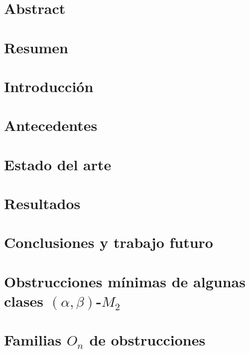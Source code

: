 \documentclass[12pt]{book}
\theoremstyle{definition}
\begin{document}





\chapter*{Abstract}

\chapter*{Resumen}


\tableofcontents

\listoffigures

\listoftables

\chapter{Introducción}

\chapter{Antecedentes}

\chapter{Estado del arte}
\label{cap3}
\chapter{Resultados}\label{cap4}

\chapter{Conclusiones y trabajo futuro}


\appendix

\chapter{Obstrucciones mínimas de algunas clases $(\alpha,\beta)$-$M_2$}
\label{apéndiceListaAlfaBeta}


\chapter{}
\label{apéndiceTablaAlfaBeta}


\chapter{Familias $O_n$ de obstrucciones}
\label{apéndiceFamiliaO}





\end{document}
